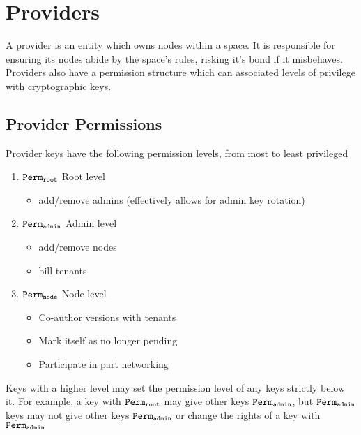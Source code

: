 \section{Providers}

A provider is an entity which owns nodes within a space. 
It is responsible for ensuring its nodes abide by the space's rules, risking it's bond if it misbehaves.
Providers also have a permission structure which can associated levels of privilege with cryptographic keys.

\subsection{Provider Permissions}
Provider keys have the following permission levels, from most to least privileged

\begin{enumerate}
  \item $\mathtt{Perm_{root}}$ Root level
    \begin{itemize}
      \item add/remove admins (effectively allows for admin key rotation)
    \end{itemize}
  \item $\mathtt{Perm_{admin}}$ Admin level
    \begin{itemize}
      \item add/remove nodes
      \item bill tenants
    \end{itemize}
  \item $\mathtt{Perm_{node}}$ Node level
    \begin{itemize}
      \item Co-author versions with tenants
      \item Mark itself as no longer pending
      \item Participate in part networking
    \end{itemize}
\end{enumerate}

Keys with a higher level may set the permission level of any keys strictly below it. 
For example, a key with $\mathtt{Perm_{root}}$ may give other keys $\mathtt{Perm_{admin}}$, but $\mathtt{Perm_{admin}}$ keys may not give other keys $\mathtt{Perm_{admin}}$ or change the rights of a key with $\mathtt{Perm_{admin}}$

